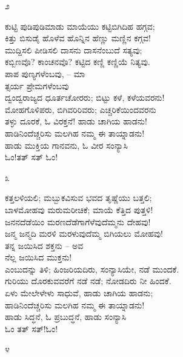 \begin{center}
೨
\end{center}

\begin{myquote}
ಕುಟ್ಟಿ ಪುಡಿಪುಡಿಮಾಡು ಮಾಯೆಯು ಕಟ್ಟಿಬಿಗಿದಿಹ ಹಗ್ಗವ;\\ಕಿತ್ತು ಬಿಸುಡೈ ಹೊಳೆವ ಹೊನ್ನಿನ ಹೆಣ್ಣು ಮಣ್ಣಿನ ಕಗ್ಗವ!\\ಮುದ್ದಿಸಲಿ ಪೀಡಿಸಲಿ ದಾಸನು ದಾಸನೆಂಬುದೆ ಸತ್ಯವು;\\ಕಬ್ಬಿಣವೊ? ಕಾಂಚನವೊ? ಕಟ್ಟಿದ ಕಣ್ಣಿ ಕಣ್ಣಿಯೆ ನಿತ್ಯವು.\\ಪಾಪ ಪುಣ್ಯಗಳೆಂಬವು, – ಮಾ\\ತ್ಸರ್ಯ ಪ್ರೇಮಗಳೆಂಬವು\\ದ್ವಂದ್ವರಾಜ್ಯದ ಧೂರ್ತಚೋರರು; ಬಿಟ್ಟು ಕಳೆ, ಕಳೆಯವರನು!\\ಮೋಹಗೊಳಿಪರು, ಬಿಗಿವರಿರಿವರು; ಎಚ್ಚರಿಕೆಯಿಂದವರನು\\ತಳ್ಳು ದೂರಕೆ, ಓ ವಿರಕ್ತನೆ! ಹಾಡು ಚಾಗಿಯ ಹಾಡನು!\\ಹಾಡಿನಿಂದೆಚ್ಚರಿಸು ಮಲಗಿಹ ನಮ್ಮ ಈ ತಾಯ್ನಾಡನು!\\ಹಾಡು ಮುಕ್ತಿಯ ಗಾನವನು, ಓ ವೀರ ಸಂನ್ಯಾಸಿ\\ಓಂ!ತತ್ ಸತ್ ಓಂ!
\end{myquote}

\begin{center}
೩
\end{center}

\begin{myquote}
ಕತ್ತಲಳಿಯಲಿ; ಮಬ್ಬುಕವಿಸುವ ಭವದ ತೃಷ್ಣೆಯು ಬತ್ತಲಿ;\\ಬಾಳಮೋಹವು ಮರುಮರೀಚಿಕೆ; ಮಾಯೆ ಕೆತ್ತಿದ ಪುತ್ತಳಿ!\\ಜನನದೆಡೆಯಿಂ ಮರಣದೆಡೆಗಾಗೆಳೆವುದೆಮ್ಮನು ದೇಹವು!\\ಜನ್ಮ ಜನ್ಮದಿ ಮರಳಿ ಮರಳುವುದೆಮ್ಮ ಬಿಗಿಯಲು ಮೋಹವು!\\ತನ್ನ ಜಯಿಸಿದ ಶಕ್ತನು – ಅವ\\ನೆಲ್ಲ ಜಯಿಸಿದ ಮುಕ್ತನು!\\ಎಂಬುದನ್ನು ತಿಳಿ; ಹಿಂಜರಿಯದಿರು, ಸಂನ್ಯಾಸಿಯೇ, ನಡೆ ಮುಂದಕೆ.\\ಗುರಿಯು ದೊರಕುವವರೆಗೆ ನಡೆ ನಡೆ; ನೋಡದಿರು ನೀ ಹಿಂದಕೆ.\\ಏಳು ಮೇಲೇಳೇಳು ಸಾಧುವೆ, ಹಾಡು ಚಾಗಿಯ ಹಾಡನು;\\ಹಾಡಿನಿಂದೆಚ್ಚರಿಸು ಮಲಗಿಹ ನಮ್ಮ ಈ ತಾಯ್ನಾಡನು!\\ಹಾಡು ಸಿದ್ಧನೆ, ಓ ಪ್ರಬುದ್ಧನೆ, ಹಾಡು ಸಂನ್ಯಾಸಿ\\ಓಂ ತತ್ ಸತ್!ಓಂ!
\end{myquote}

\begin{center}
೪
\end{center}

